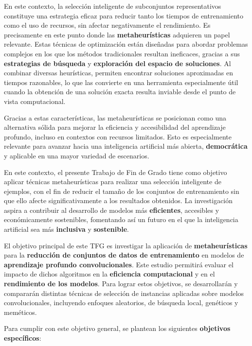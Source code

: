 En este contexto, la selección inteligente de subconjuntos representativos constituye una estrategia eficaz para reducir tanto
los tiempos de entrenamiento como el uso de recursos, sin afectar negativamente el rendimiento.
Es precisamente en este punto donde las \textbf{metaheurísticas} adquieren un papel relevante.
Estas técnicas de optimización están diseñadas para abordar problemas complejos en los que los métodos tradicionales
resultan ineficaces, gracias a sus \textbf{estrategias de búsqueda} y \textbf{exploración del espacio de soluciones}.
Al combinar diversas heurísticas, permiten encontrar soluciones aproximadas en tiempos razonables, lo que las convierte
en una herramienta especialmente útil cuando la obtención de una solución exacta resulta inviable desde el punto de
vista computacional.


Gracias a estas características, las metaheurísticas se posicionan como una alternativa sólida 
para mejorar la eficiencia y accesibilidad del aprendizaje profundo, incluso en contextos con recursos limitados.
Esto es especialmente relevante para avanzar hacia una inteligencia artificial más abierta, \textbf{democrática} y aplicable
en una mayor variedad de escenarios.


En este contexto, el presente Trabajo de Fin de Grado tiene como objetivo aplicar técnicas metaheurísticas para realizar una selección
inteligente de ejemplos, con el fin de reducir el tamaño de los conjuntos de entrenamiento sin que ello afecte
significativamente a los resultados obtenidos.
La investigación aspira a contribuir al desarrollo de modelos más \textbf{eficientes}, accesibles y económicamente
sostenibles, fomentando así un futuro en el que la inteligencia artificial sea más \textbf{inclusiva} y
\textbf{sostenible}.


El objetivo principal de este TFG es investigar la aplicación de \textbf{metaheurísticas} para la
\textbf{reducción de conjuntos de datos de entrenamiento} en modelos de \textbf{aprendizaje profundo convolucionales}.
Este estudio permitirá evaluar el impacto de dichos algoritmos en la \textbf{eficiencia computacional} y en el
\textbf{rendimiento de los modelos}.
Para lograr estos objetivos, se desarrollarán y compararán distintas técnicas de selección de instancias aplicadas
sobre modelos convolucionales, incluyendo enfoques aleatorios, de búsqueda local, genéticos y meméticos.


Para cumplir con este objetivo general, se plantean los siguientes \textbf{objetivos específicos}:

